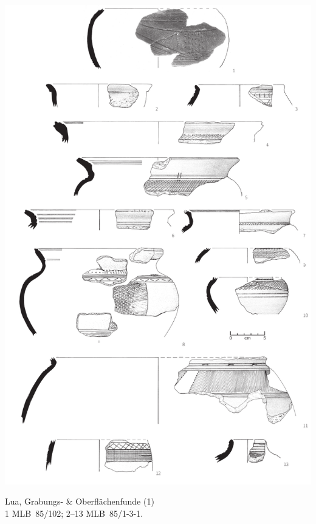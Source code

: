 \begin{pl}[H]
	\includegraphics{plt/Taf25.pdf}
	\vspace{.75em}\caption{Lua, Grabungs- \& Oberflächenfunde (1) \\ 1 MLB~85/102; 2--13 MLB~85/1-3-1.}
	\label{pl:25}
\end{pl}

